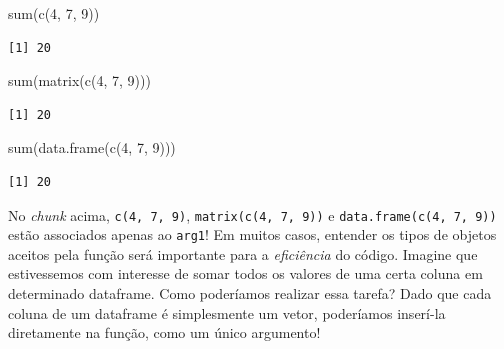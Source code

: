 \documentclass[
  letterpaper,
  DIV=11,
  numbers=noendperiod]{scrreprt}
\newenvironment{Shaded}{\begin{snugshade}}{\end{snugshade}}
\newcommand{\AttributeTok}[1]{\textcolor[rgb]{0.40,0.45,0.13}{#1}}
\newcommand{\DecValTok}[1]{\textcolor[rgb]{0.68,0.00,0.00}{#1}}
\newcommand{\FunctionTok}[1]{\textcolor[rgb]{0.28,0.35,0.67}{#1}}
\newcommand{\NormalTok}[1]{\textcolor[rgb]{0.00,0.23,0.31}{#1}}
\newcommand{\OtherTok}[1]{\textcolor[rgb]{0.00,0.23,0.31}{#1}}
\newcommand{\SpecialCharTok}[1]{\textcolor[rgb]{0.37,0.37,0.37}{#1}}
\begin{document}
\begin{tcolorbox}
\begin{Shaded}
\begin{Highlighting}[]
\FunctionTok{sum}\NormalTok{(}\FunctionTok{c}\NormalTok{(}\DecValTok{4}\NormalTok{, }\DecValTok{7}\NormalTok{, }\DecValTok{9}\NormalTok{))}
\end{Highlighting}
\end{Shaded}

\begin{verbatim}
[1] 20
\end{verbatim}

\begin{Shaded}
\begin{Highlighting}[]
\FunctionTok{sum}\NormalTok{(}\FunctionTok{matrix}\NormalTok{(}\FunctionTok{c}\NormalTok{(}\DecValTok{4}\NormalTok{, }\DecValTok{7}\NormalTok{, }\DecValTok{9}\NormalTok{)))}
\end{Highlighting}
\end{Shaded}

\begin{verbatim}
[1] 20
\end{verbatim}

\begin{Shaded}
\begin{Highlighting}[]
\FunctionTok{sum}\NormalTok{(}\FunctionTok{data.frame}\NormalTok{(}\FunctionTok{c}\NormalTok{(}\DecValTok{4}\NormalTok{, }\DecValTok{7}\NormalTok{, }\DecValTok{9}\NormalTok{)))}
\end{Highlighting}
\end{Shaded}

\begin{verbatim}
[1] 20
\end{verbatim}

No \emph{chunk} acima, \texttt{c(4,\ 7,\ 9)},
\texttt{matrix(c(4,\ 7,\ 9))} e \texttt{data.frame(c(4,\ 7,\ 9))} estão
associados apenas ao \texttt{arg1}! Em muitos casos, entender os tipos
de objetos aceitos pela função será importante para a \emph{eficiência}
do código. Imagine que estivessemos com interesse de somar todos os
valores de uma certa coluna em determinado dataframe. Como poderíamos
realizar essa tarefa? Dado que cada coluna de um dataframe é
simplesmente um vetor, poderíamos inserí-la diretamente na função, como
um único argumento!

\begin{Shaded}
\end{Shaded}


\end{tcolorbox}
\end{document}
